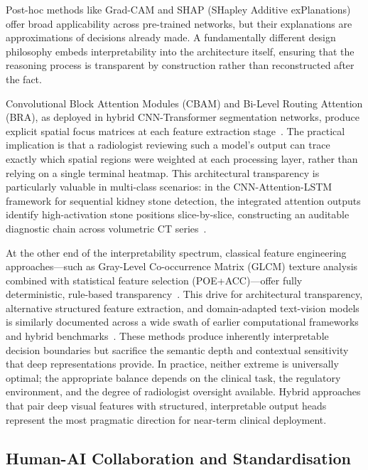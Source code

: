 Post-hoc methods like Grad-CAM and SHAP (SHapley Additive exPlanations) offer broad applicability across pre-trained networks, but their explanations are approximations of decisions already made. A fundamentally different design philosophy embeds interpretability into the architecture itself, ensuring that the reasoning process is transparent by construction rather than reconstructed after the fact.

Convolutional Block Attention Modules (CBAM) and Bi-Level Routing Attention (BRA), as deployed in hybrid CNN-Transformer segmentation networks, produce explicit spatial focus matrices at each feature extraction stage~\cite{lan2024braunet}. The practical implication is that a radiologist reviewing such a model's output can trace exactly which spatial regions were weighted at each processing layer, rather than relying on a single terminal heatmap. This architectural transparency is particularly valuable in multi-class scenarios: in the CNN-Attention-LSTM framework for sequential kidney stone detection, the integrated attention outputs identify high-activation stone positions slice-by-slice, constructing an auditable diagnostic chain across volumetric CT series~\cite{alebada2026hybrid}.

At the other end of the interpretability spectrum, classical feature engineering approaches---such as Gray-Level Co-occurrence Matrix (GLCM) texture analysis combined with statistical feature selection (POE+ACC)---offer fully deterministic, rule-based transparency~\cite{farjad2021ct}. This drive for architectural transparency, alternative structured feature extraction, and domain-adapted text-vision models is similarly documented across a wide swath of earlier computational frameworks and hybrid benchmarks~\cite{hossain2024adaptive, elton2022deep, lee2020biobert, fang2023bioformer, luo2022biogpt, hatsutani2023protuberance, sharma2025hybrid, martin2025evaluation}. These methods produce inherently interpretable decision boundaries but sacrifice the semantic depth and contextual sensitivity that deep representations provide. In practice, neither extreme is universally optimal; the appropriate balance depends on the clinical task, the regulatory environment, and the degree of radiologist oversight available. Hybrid approaches that pair deep visual features with structured, interpretable output heads represent the most pragmatic direction for near-term clinical deployment.

\subsection{Human-AI Collaboration and Standardisation}
\label{subsec:human_ai}

